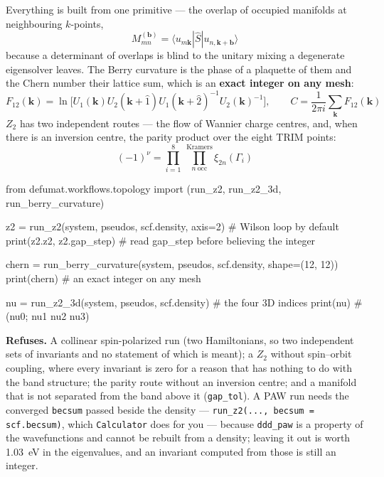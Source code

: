 \documentclass[11pt,a4paper]{article}
\newcommand{\code}[1]{\texttt{\small #1}}
\begin{document}
Everything is built from one primitive --- the overlap of occupied manifolds at
neighbouring $k$-points,
\begin{equation*}
M^{(\mathbf b)}_{mn} = \langle u_{m\mathbf k}|\hat S|u_{n,\mathbf k+\mathbf b}\rangle
\end{equation*}
because a determinant of overlaps is blind to the unitary mixing a degenerate
eigensolver leaves. The Berry curvature is the phase of a plaquette of them and
the Chern number their lattice sum, which is an \textbf{exact integer on any
mesh}:
\begin{equation*}
F_{12}(\mathbf k) = \ln\big[U_1(\mathbf k)U_2(\mathbf k{+}\hat 1)
  U_1(\mathbf k{+}\hat 2)^{-1}U_2(\mathbf k)^{-1}\big],
\qquad C = \frac{1}{2\pi i}\sum_{\mathbf k} F_{12}(\mathbf k)
\end{equation*}
$Z_2$ has two independent routes --- the flow of Wannier charge centres, and,
when there is an inversion centre, the parity product over the eight TRIM
points:
\begin{equation*}
(-1)^{\nu} = \prod_{i=1}^{8}\ \prod_{n\ \mathrm{occ}}^{\mathrm{Kramers}}
  \xi_{2n}(\Gamma_i)
\end{equation*}

\begin{pycode}
from defumat.workflows.topology import (run_z2, run_z2_3d,
                                         run_berry_curvature)

z2 = run_z2(system, pseudos, scf.density, axis=2)   # Wilson loop by default
print(z2.z2, z2.gap_step)   # read gap_step before believing the integer

chern = run_berry_curvature(system, pseudos, scf.density, shape=(12, 12))
print(chern)                # an exact integer on any mesh

nu = run_z2_3d(system, pseudos, scf.density)   # the four 3D indices
print(nu)                   # (nu0; nu1 nu2 nu3)
\end{pycode}

\begin{refuses}
\textbf{Refuses.} A collinear spin-polarized run (two Hamiltonians, so two
independent sets of invariants and no statement of which is meant); a $Z_2$
without spin--orbit coupling, where every invariant is zero for a reason that
has nothing to do with the band structure; the parity route without an
inversion centre; and a manifold that is not separated from the band above it
(\code{gap\_tol}). A PAW run needs the converged \code{becsum} passed beside
the density --- \code{run\_z2(..., becsum = scf.becsum)}, which
\code{Calculator} does for you --- because \code{ddd\_paw} is a property of the
wavefunctions and cannot be rebuilt from a density; leaving it out is worth
1.03~eV in the eigenvalues, and an invariant computed from those is still an
integer.
\end{refuses}
\end{document}
